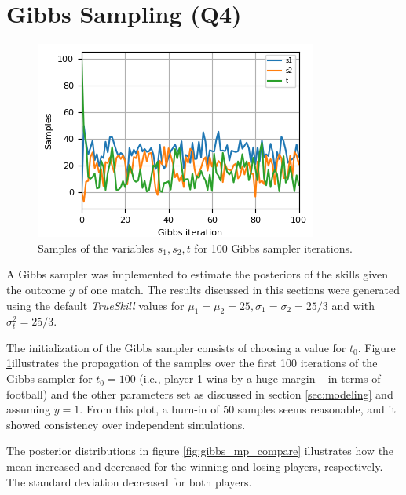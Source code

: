 \documentclass{article}
\begin{document}
	\section{Gibbs Sampling (Q4)}
	\begin{figure}
		\begin{center}
			\includegraphics[width=\linewidth]{q_4_samples}
		\end{center}
		\caption{\footnotesize{Samples of the variables $ s_1,s_2,t $ for 100 Gibbs sampler iterations.}}
		\label{fig:q_4_1}
	\end{figure}
	
	A Gibbs sampler was implemented to estimate the posteriors of the skills given the outcome $y$ of one match. The results discussed in this sections were generated using the default \textit{TrueSkill} values for $ \mu_1=\mu_2=25, \sigma_1=\sigma_2=25/3 $ and with $ \sigma_t^2=25/3 $.
	
	The initialization of the Gibbs sampler consists of choosing a value for $t_0$. Figure \ref{fig:q_4_1}illustrates the propagation of the samples over the first 100 iterations of the Gibbs sampler for $t_0=100$ (i.e., player 1 wins by a huge margin -- in terms of football) and the other parameters set as discussed in section \ref{sec:modeling} and assuming $y=1$. From this plot, a burn-in of 50 samples seems reasonable, and it showed consistency over independent simulations.	
	
	The posterior distributions in figure \ref{fig:gibbs_mp_compare} illustrates how the mean increased and decreased for the winning and losing players, respectively.
	The standard deviation decreased for both players.
\end{document}
